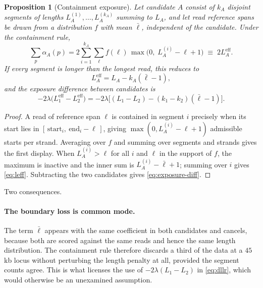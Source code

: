 \documentclass[11pt]{article}
\newtheorem{proposition}{Proposition}
\begin{document}
\begin{proposition}[Containment exposure]
\label{prop:exposure}
Let candidate $A$ consist of $k_A$ disjoint segments of lengths
$L_A^{(1)},\dots,L_A^{(k_A)}$ summing to $L_A$, and let read reference spans be
drawn from a distribution $f$ with mean $\bar\ell$, independent of the
candidate.  Under the containment rule,
\begin{equation}
    \sum_{p}\alpha_A(p)
    = 2\sum_{i=1}^{k_A}\sum_{\ell} f(\ell)\,\max\!\big(0,\;L_A^{(i)}-\ell+1\big)
    \;\equiv\; 2 L_A^{\mathrm{eff}} .
\end{equation}
If every segment is longer than the longest read, this reduces to
\begin{equation}
    L_A^{\mathrm{eff}} = L_A - k_A(\bar\ell - 1),
\label{eq:leff}
\end{equation}
and the exposure difference between candidates is
\begin{equation}
    -2\lambda\big(L_1^{\mathrm{eff}} - L_2^{\mathrm{eff}}\big)
    = -2\lambda\Big[(L_1-L_2) - (k_1-k_2)(\bar\ell-1)\Big].
\label{eq:exposure-diff}
\end{equation}
\end{proposition}

\begin{proof}
A read of reference span $\ell$ is contained in segment $i$ precisely when its
start lies in $[\,\text{start}_i,\ \text{end}_i-\ell\,]$, giving
$\max(0, L_A^{(i)}-\ell+1)$ admissible starts per strand.  Averaging over $f$
and summing over segments and strands gives the first display.  When
$L_A^{(i)} > \ell$ for all $i$ and $\ell$ in the support of $f$, the maximum is
inactive and the inner sum is $L_A^{(i)} - \bar\ell + 1$; summing over $i$ gives
\eqref{eq:leff}.  Subtracting the two candidates gives
\eqref{eq:exposure-diff}.
\end{proof}

Two consequences.

\paragraph{The boundary loss is common mode.}  The term $\bar\ell$ appears with
the same coefficient in both candidates and cancels, because both are scored
against the same reads and hence the same length distribution.  The
containment rule therefore discards a third of the data at a $45$\,kb locus
without perturbing the length penalty at all, provided the segment counts agree.
This is what licenses the use of $-2\lambda(L_1-L_2)$ in
\eqref{eq:dllr}, which would otherwise be an unexamined assumption.
\end{document}
